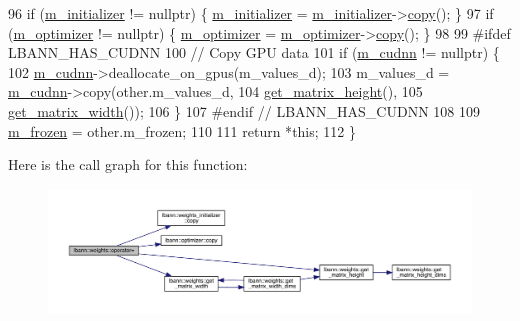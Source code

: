 \begin{DoxyCode}
96   \textcolor{keywordflow}{if} (\hyperlink{classlbann_1_1weights_a3ddbcce8d543e975efeebdb43e82444c}{m\_initializer} != \textcolor{keyword}{nullptr}) \{ \hyperlink{classlbann_1_1weights_a3ddbcce8d543e975efeebdb43e82444c}{m\_initializer} = 
      \hyperlink{classlbann_1_1weights_a3ddbcce8d543e975efeebdb43e82444c}{m\_initializer}->\hyperlink{classlbann_1_1weights__initializer_acc84ce49188b74b23987cef3db18525a}{copy}(); \}
97   \textcolor{keywordflow}{if} (\hyperlink{classlbann_1_1weights_a5f3b4d4a3ad390c2a9bdbe6c4971de65}{m\_optimizer} != \textcolor{keyword}{nullptr})   \{ \hyperlink{classlbann_1_1weights_a5f3b4d4a3ad390c2a9bdbe6c4971de65}{m\_optimizer} = 
      \hyperlink{classlbann_1_1weights_a5f3b4d4a3ad390c2a9bdbe6c4971de65}{m\_optimizer}->\hyperlink{classlbann_1_1optimizer_adf19a1d19d832ebfe70072cc202cdf39}{copy}(); \}
98 
99 \textcolor{preprocessor}{  #ifdef LBANN\_HAS\_CUDNN}
100   \textcolor{comment}{// Copy GPU data}
101   \textcolor{keywordflow}{if} (\hyperlink{classlbann_1_1weights_a873e8c14998915e442d03b8dd7d2fdf7}{m\_cudnn} != \textcolor{keyword}{nullptr}) \{
102     \hyperlink{classlbann_1_1weights_a873e8c14998915e442d03b8dd7d2fdf7}{m\_cudnn}->deallocate\_on\_gpus(m\_values\_d);
103     m\_values\_d = \hyperlink{classlbann_1_1weights_a873e8c14998915e442d03b8dd7d2fdf7}{m\_cudnn}->copy(other.m\_values\_d,
104                                \hyperlink{classlbann_1_1weights_ad36676b9b43bced1cc7e332e3745411f}{get\_matrix\_height}(),
105                                \hyperlink{classlbann_1_1weights_abc3cf3a5b992302b1eaaea1fdf3b377d}{get\_matrix\_width}());
106   \}
107 \textcolor{preprocessor}{  #endif // LBANN\_HAS\_CUDNN}
108 
109   \hyperlink{classlbann_1_1weights_a3962305112ba98ef2eb89c6f7035f6dd}{m\_frozen} = other.m\_frozen;
110 
111   \textcolor{keywordflow}{return} *\textcolor{keyword}{this};
112 \}
\end{DoxyCode}
Here is the call graph for this function\+:\nopagebreak
\begin{figure}[H]
\begin{center}
\leavevmode
\includegraphics[width=350pt]{classlbann_1_1weights_ac1021a88dc4efe5f91a40fae223edf4b_cgraph}
\end{center}
\end{figure}
\mbox{\label{classlbann_1_1weights_a48dd6b3d37668bf2ab5abafdf9dabde4}} 
